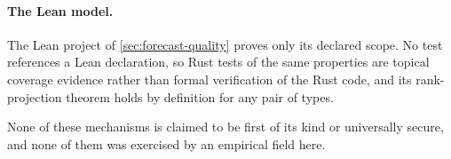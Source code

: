 \paragraph{The Lean model.} The Lean project of \cref{sec:forecast-quality} proves only its declared scope. No test references a Lean declaration, so Rust tests of the same properties are topical coverage evidence rather than formal verification of the Rust code, and its rank-projection theorem holds by definition for any pair of types.

None of these mechanisms is claimed to be first of its kind or universally secure, and none of them was exercised by an empirical field here.
